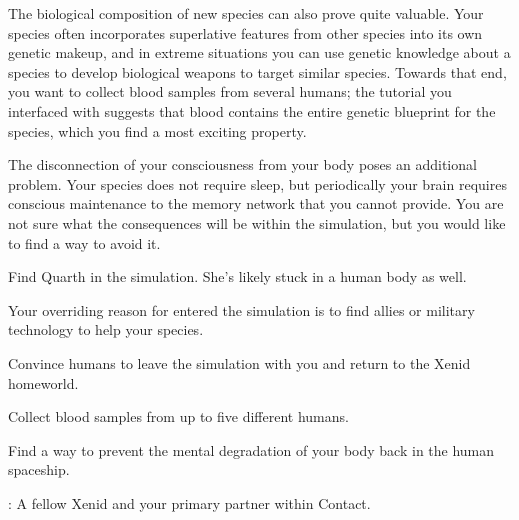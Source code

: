\documentclass[char]{guildcamp1}
\begin{document}
The biological composition of new species can also prove quite valuable. Your species often incorporates superlative features from other species into its own genetic makeup, and in extreme situations you can use genetic knowledge about a species to develop biological weapons to target similar species. Towards that end, you want to collect blood samples from several humans; the tutorial you interfaced with suggests that blood contains the entire genetic blueprint for the species, which you find a most exciting property.

The disconnection of your consciousness from your body poses an additional problem. Your species does not require sleep, but periodically your brain requires conscious maintenance to the memory network that you cannot provide. You are not sure what the consequences will be within the simulation, but you would like to find a way to avoid it.

\begin{itemz}[Goals]
  \item Find Quarth in the simulation. She's likely stuck in a human body as well.
  \item Your overriding reason for entered the simulation is to find allies or military technology to help your species.
  \item Convince humans to leave the simulation with you and return to the Xenid homeworld.
  \item Collect blood samples from up to five different humans.
  \item Find a way to prevent the mental degradation of your body back in the human spaceship.
\end{itemz}


  
\begin{contacts}
  \contact{\cPassive{}}: A fellow Xenid and your primary partner within Contact.
\end{contacts}
\end{document}
